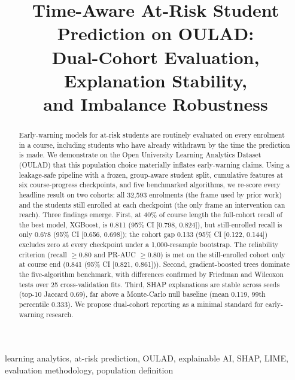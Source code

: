 \documentclass[conference]{IEEEtran}
\begin{document}
\title{Time-Aware At-Risk Student Prediction on OULAD:\\
Dual-Cohort Evaluation, Explanation Stability,\\
and Imbalance Robustness}

\author{
}

\maketitle

\begin{abstract}
Early-warning models for at-risk students are routinely evaluated on every
enrolment in a course, including students who have already withdrawn by the
time the prediction is made. We demonstrate on the Open University Learning
Analytics Dataset (OULAD) that this population choice materially inflates
early-warning claims. Using a leakage-safe pipeline with a frozen,
group-aware student split, cumulative features at six course-progress
checkpoints, and five benchmarked algorithms, we re-score every headline
result on two cohorts: all 32,593 enrolments (the frame used by prior work)
and the students still enrolled at each checkpoint (the only frame an
intervention can reach). Three findings emerge. First, at 40\% of course
length the full-cohort recall of the best model, XGBoost, is
0.811 (95\% CI [0.798, 0.824]), but still-enrolled recall is only
0.678 (95\% CI [0.656, 0.698]); the cohort gap 0.133 (95\% CI [0.122, 0.144]) excludes zero
at every checkpoint under a 1,000-resample bootstrap. The reliability
criterion (recall $\geq 0.80$ and PR-AUC $\geq 0.80$) is met on the
still-enrolled cohort only at course end (0.841 (95\% CI [0.821, 0.861])).
Second, gradient-boosted trees dominate the five-algorithm benchmark, with
differences confirmed by Friedman and Wilcoxon tests over 25
cross-validation fits. Third, SHAP explanations are stable across seeds
(top-10 Jaccard 0.69), far above a Monte-Carlo null baseline
(mean 0.119, 99th percentile 0.333). We propose
dual-cohort reporting as a minimal standard for early-warning research.
\end{abstract}

\begin{IEEEkeywords}
learning analytics, at-risk prediction, OULAD, explainable AI, SHAP, LIME,
evaluation methodology, population definition
\end{IEEEkeywords}
\end{document}
